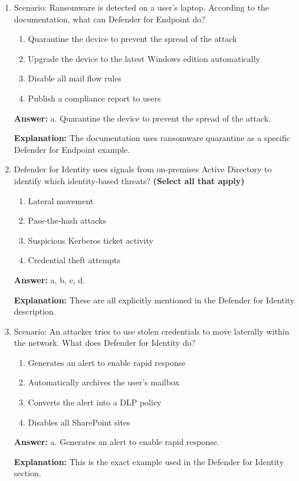 \documentclass[10pt]{article}
\begin{document}
\begin{enumerate}[leftmargin=*]
\item Scenario: Ransomware is detected on a user’s laptop. According to the documentation, what can Defender for Endpoint do?
\begin{enumerate}[label=\alph*., leftmargin=1.5em]
\item Quarantine the device to prevent the spread of the attack
\item Upgrade the device to the latest Windows edition automatically
\item Disable all mail flow rules
\item Publish a compliance report to users
\end{enumerate}
\textbf{Answer:} a. Quarantine the device to prevent the spread of the attack.

\textbf{Explanation:} The documentation uses ransomware quarantine as a specific Defender for Endpoint example.

\item Defender for Identity uses signals from on-premises Active Directory to identify which identity-based threats? \textbf{(Select all that apply)}
\begin{enumerate}[label=\alph*., leftmargin=1.5em]
\item Lateral movement
\item Pass-the-hash attacks
\item Suspicious Kerberos ticket activity
\item Credential theft attempts
\end{enumerate}
\textbf{Answer:} a, b, c, d.

\textbf{Explanation:} These are all explicitly mentioned in the Defender for Identity description.

\item Scenario: An attacker tries to use stolen credentials to move laterally within the network. What does Defender for Identity do?
\begin{enumerate}[label=\alph*., leftmargin=1.5em]
\item Generates an alert to enable rapid response
\item Automatically archives the user’s mailbox
\item Converts the alert into a DLP policy
\item Disables all SharePoint sites
\end{enumerate}
\textbf{Answer:} a. Generates an alert to enable rapid response.

\textbf{Explanation:} This is the exact example used in the Defender for Identity section.


\end{enumerate}
\end{document}

